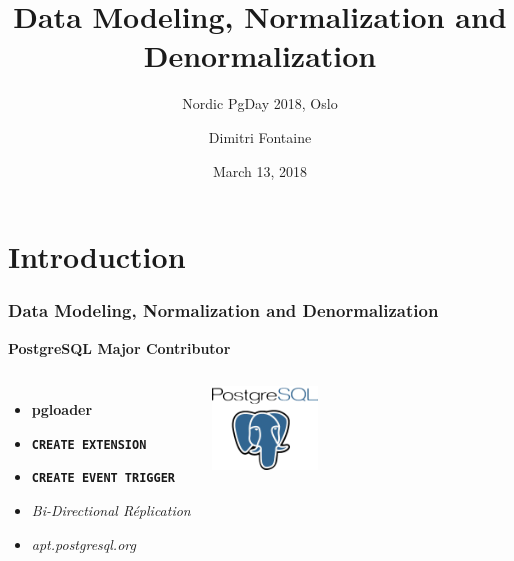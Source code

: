 \documentclass[xcolor=dvipsnames]{beamer}
\title{Data Modeling, Normalization and Denormalization}
\subtitle{Nordic PgDay 2018, Oslo}
\author{Dimitri Fontaine}
\institute{CitusData}
\date{March 13, 2018}
\begin{document}
\section{Introduction}

\frame{\titlepage}

\begin{frame}[fragile]
  \frametitle{Data Modeling, Normalization and Denormalization}

  \begin{center}
    {}
    \vfill
    {\Large \textbf{PostgreSQL Major Contributor}}
  \end{center}

\begin{columns}[c]

  \begin{itemize}
   \item \textbf{pgloader}
   \item \texttt{\textbf{CREATE EXTENSION}}
   \item \texttt{\textbf{CREATE EVENT TRIGGER}}
   \item \textit{Bi-Directional Réplication}
   \item \textit{apt.postgresql.org}
  \end{itemize}  

\begin{center}
  \includegraphics[height=6em]{postgres-logo.png}
\end{center}
\end{columns}
\end{frame}
\end{document}
